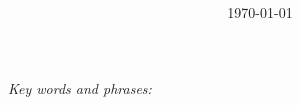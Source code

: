 \documentclass[11pt]{article}
\title{
}
\author{
}
\date{\today}
\numberwithin{equation}{section}
\numberwithin{table}{section}
\numberwithin{figure}{section}
\begin{document}
\maketitle

\begin{abstract}
\end{abstract}

\emph{Key words and phrases:} 

\tableofcontents





\end{document}
